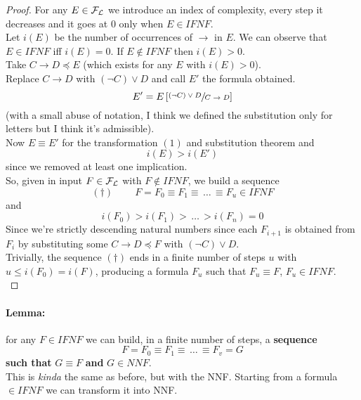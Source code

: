 	\begin{proof}
		For any $E \in \mathcal{F}_\mathcal{L}$ we introduce an index of complexity, every step it decreases and it goes at 0 only when $E \in IFNF$.\\

		Let $i(E)$ be the number of occurrences of $\rightarrow$ in $E$. We can observe that $E \in IFNF$ iff $i(E) = 0$. If $E \notin IFNF$ then $i(E) > 0$.\\

		Take $C \rightarrow D \preceq E$ (which exists for any $E$ with $i(E) > 0$).\\

		Replace $C \rightarrow D$ with $(\neg C) \vee D$ and call $E'$ the formula obtained.\\
		$$ E' = E\left[\sfrac{(\neg C) \vee D}{C \rightarrow D}\right]$$
		(with a small abuse of notation, I think we defined the substitution only for letters but I think it's admissible).\\

		Now $E \equiv E'$ for the transformation $(1)$ and substitution theorem and
		$$ i(E) > i(E')$$
		since we removed at least one implication.\\

		So, given in input $F \in \mathcal{F}_\mathcal{L}$ with $F \notin IFNF$, we build a sequence
		$$ (\dag) \;\;\;\;\;\;\;\; F = F_0 \equiv F_1\equiv \, \dots \, \equiv F_u \in IFNF $$
		and
		$$ i(F_0) > i(F_1) > \, \dots \, > i(F_n) = 0 $$
		Since we're strictly descending natural numbers since each $F_{i+1}$ is obtained from $F_i$ by substituting some $C \rightarrow D \preceq F$ with $(\neg C) \vee D$.\\

		Trivially, the sequence $(\dag)$ ends in a finite number of steps $u$ with $u \leq i(F_0) = i(F)$, producing a formula $F_u$ such that $F_u \equiv F$, $F_u \in IFNF$.\\
	\end{proof}

	\paragraph{Lemma:} for any $F \in IFNF$ we can build, in a finite number of steps, a \textbf{sequence}
	$$ F = F_0 \equiv F_1 \equiv \, \dots \, \equiv F_v = G $$
	\textbf{such that} $G \equiv F$ \textbf{and} $G \in NNF$.\\
	This is \textit{kinda} the same as before, but with the NNF. Starting from a formula $\in IFNF$ we can transform it into NNF.\\

